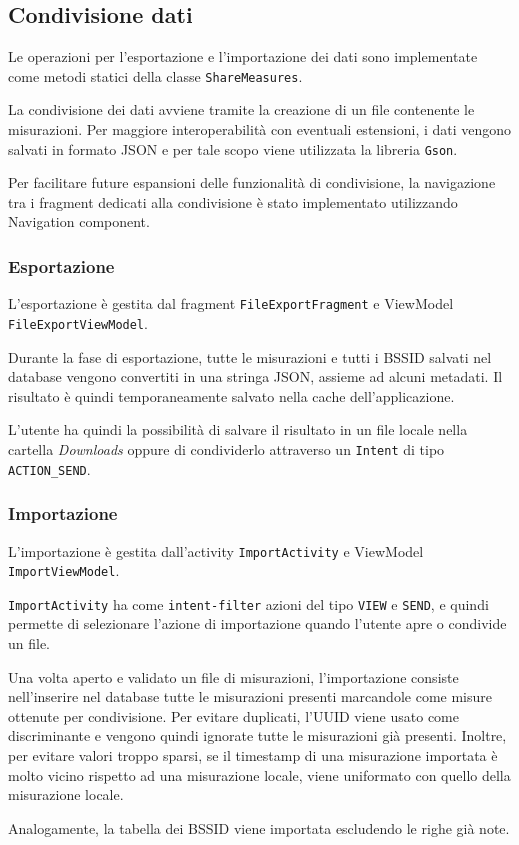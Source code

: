 
\subsection{Condivisione dati}

Le operazioni per l'esportazione e l'importazione dei dati sono implementate come metodi statici della classe \texttt{ShareMeasures}.

La condivisione dei dati avviene tramite la creazione di un file contenente le misurazioni.
Per maggiore interoperabilità con eventuali estensioni, i dati vengono salvati in formato JSON e per tale scopo viene utilizzata la libreria \texttt{Gson}.

Per facilitare future espansioni delle funzionalità di condivisione, la navigazione tra i fragment dedicati alla condivisione è stato implementato utilizzando Navigation component.

\subsubsection{Esportazione}
L'esportazione è gestita dal fragment \texttt{FileExportFragment} e ViewModel \texttt{FileExportViewModel}.

Durante la fase di esportazione, tutte le misurazioni e tutti i BSSID salvati nel database vengono convertiti in una stringa JSON, assieme ad alcuni metadati. Il risultato è quindi temporaneamente salvato nella cache dell'applicazione.

L'utente ha quindi la possibilità di salvare il risultato in un file locale nella cartella \textit{Downloads} oppure di condividerlo attraverso un \texttt{Intent} di tipo \texttt{ACTION\_SEND}.


\subsubsection{Importazione}
L'importazione è gestita dall'activity \texttt{ImportActivity} e ViewModel \texttt{ImportViewModel}.

\texttt{ImportActivity} ha come \texttt{intent-filter} azioni del tipo \texttt{VIEW} e \texttt{SEND}, e quindi permette di selezionare l'azione di importazione quando l'utente apre o condivide un file.

Una volta aperto e validato un file di misurazioni, l'importazione consiste nell'inserire nel database tutte le misurazioni presenti marcandole come misure ottenute per condivisione. Per evitare duplicati, l'UUID viene usato come discriminante e vengono quindi ignorate tutte le misurazioni già presenti.
Inoltre, per evitare valori troppo sparsi, se il timestamp di una misurazione importata è molto vicino rispetto ad una misurazione locale, viene uniformato con quello della misurazione locale.

Analogamente, la tabella dei BSSID viene importata escludendo le righe già note.